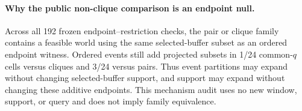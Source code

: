 \paragraph{Why the public non-clique comparison is an endpoint null.}
Across all 192 frozen endpoint--restriction checks, the pair or clique family contains a feasible world using the same selected-buffer subset as an ordered endpoint witness. Ordered events still add projected subsets in 1/24 common-$q$ cells versus cliques and 3/24 versus pairs. Thus event partitions may expand without changing selected-buffer support, and support may expand without changing these additive endpoints.
This mechanism audit uses no new window, support, or query and does not imply family equivalence.
